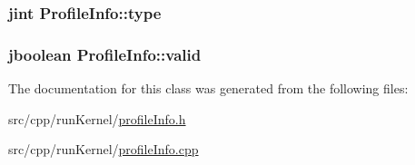 \hypertarget{class_profile_info_ada010e927fe637af4bb5c9d819fce9fe}{
\subsubsection[{type}]{\setlength{\rightskip}{0pt plus 5cm}jint Profile\-Info\-::type}}\label{class_profile_info_ada010e927fe637af4bb5c9d819fce9fe}
\hypertarget{class_profile_info_a631dfbd490844e5922a6e3721dccccc5}{
\subsubsection[{valid}]{\setlength{\rightskip}{0pt plus 5cm}jboolean Profile\-Info\-::valid}}\label{class_profile_info_a631dfbd490844e5922a6e3721dccccc5}


The documentation for this class was generated from the following files\-:\begin{DoxyCompactItemize}
\item 
src/cpp/run\-Kernel/\hyperlink{profile_info_8h}{profile\-Info.\-h}\item 
src/cpp/run\-Kernel/\hyperlink{profile_info_8cpp}{profile\-Info.\-cpp}\end{DoxyCompactItemize}
